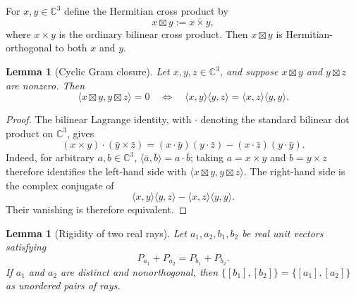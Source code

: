 \documentclass[12pt,a4paper]{article}
\newtheorem{lemma}[theorem]{Lemma}
\theoremstyle{definition}
\theoremstyle{remark}
\newcommand{\C}{\mathbb C}
\begin{document}
For $x,y\in\C^3$ define the Hermitian cross product by
\begin{equation}
 x\boxtimes y:=\overline{x\times y},
 \label{eq:hcross}
\end{equation}
where $x\times y$ is the ordinary bilinear cross product.  Then
$x\boxtimes y$ is Hermitian-orthogonal to both $x$ and $y$.

\begin{lemma}[Cyclic Gram closure]
\label{lem:gram-closure}
Let $x,y,z\in\C^3$, and suppose $x\boxtimes y$ and
$y\boxtimes z$ are nonzero.  Then
\begin{equation}
 \langle x\boxtimes y,y\boxtimes z\rangle=0
 \quad\Longleftrightarrow\quad
 \langle x,y\rangle\langle y,z\rangle
 =\langle x,z\rangle\langle y,y\rangle.
 \label{eq:gram-closure}
\end{equation}
\end{lemma}

\begin{proof}
The bilinear Lagrange identity, with $\mathbin{\cdot}$ denoting the standard
bilinear dot product on $\C^3$, gives
\[
 (x\times y)\mathbin{\cdot}(\bar y\times\bar z)
 =(x\mathbin{\cdot}\bar y)(y\mathbin{\cdot}\bar z)
 -(x\mathbin{\cdot}\bar z)(y\mathbin{\cdot}\bar y).
\]
Indeed, for arbitrary $a,b\in\C^3$,
$\langle\bar a,\bar b\rangle=a\mathbin{\cdot}\bar b$; taking
$a=x\times y$ and $b=y\times z$ therefore identifies the left-hand side
with $\langle x\boxtimes y,y\boxtimes z\rangle$.  The right-hand side
is the complex conjugate of
\[
 \langle x,y\rangle\langle y,z\rangle
 -\langle x,z\rangle\langle y,y\rangle.
\]
Their vanishing is therefore equivalent.
\end{proof}

\begin{lemma}[Rigidity of two real rays]
\label{lem:real-rigidity}
Let $a_1,a_2,b_1,b_2$ be real unit vectors satisfying
\begin{equation}
 P_{a_1}+P_{a_2}=P_{b_1}+P_{b_2}.
 \label{eq:two-sums}
\end{equation}
If $a_1$ and $a_2$ are distinct and nonorthogonal, then
$\{[b_1],[b_2]\}=\{[a_1],[a_2]\}$ as unordered pairs of rays.
\end{lemma}
\end{document}
